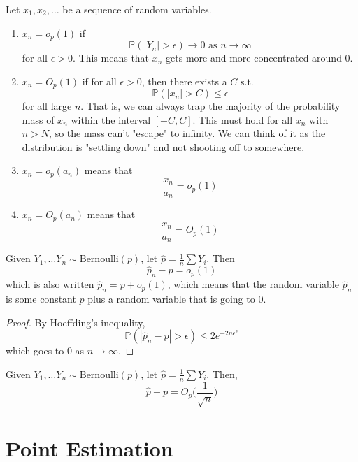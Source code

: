 \documentclass{article}
\begin{document}
    \begin{definition}[$O_p, o_p$ Notation]
    Let $x_1, x_2, \ldots $ be a sequence of random variables. 
    \begin{enumerate}
        \item $x_n = o_p (1)$ if 
        \[\mathbb{P}(|Y_n| > \epsilon) \rightarrow 0 \text{ as } n \rightarrow \infty\]
        for all $\epsilon > 0$. This means that $x_n$ gets more and more concentrated around $0$. 

        \item $x_n = O_p(1)$ if for all $\epsilon > 0$, then there exists a $C$ s.t. 
        \[\mathbb{P}(|x_n| > C) \leq \epsilon\]
        for all large $n$. That is, we can always trap the majority of the probability mass of $x_n$ within the interval $[-C, C]$. This must hold for all $x_n$ with $n > N$, so the mass can't "escape" to infinity. We can think of it as the distribution is "settling down" and not shooting off to somewhere. 

        \item $x_n = o_p (a_n)$ means that 
        \[\frac{x_n}{a_n} = o_p (1)\]

        \item $x_n = O_p (a_n)$ means that 
        \[\frac{x_n}{a_n} = O_p(1)\]
    \end{enumerate}
    \end{definition}

    \begin{theorem}
    Given $Y_1, \ldots Y_n \sim \mathrm{Bernoulli}(p)$, let $\widehat{p} = \frac{1}{n} \sum Y_i$. Then 
    \[\widehat{p}_n - p = o_p (1)\]
    which is also written $\widehat{p}_n = p + o_p (1)$, which means that the random variable $\widehat{p}_n$ is some constant $p$ plus a random variable that is going to $0$. 
    \end{theorem}
    \begin{proof}
    By Hoeffding's inequality, 
    \[\mathbb{P}(| \widehat{p}_n - p | > \epsilon) \leq 2 e^{-2n \epsilon^2}\]
    which goes to $0$ as $n \rightarrow \infty$. 
    \end{proof}

    \begin{example}
    Given $Y_1, \ldots Y_n \sim \mathrm{Bernoulli}(p)$, let $\widehat{p} = \frac{1}{n} \sum Y_i$. Then, 
    \[\widehat{p} - p = O_p \Big( \frac{1}{\sqrt{n}} \Big)\]
    \end{example}

\section{Point Estimation}
\end{document}
